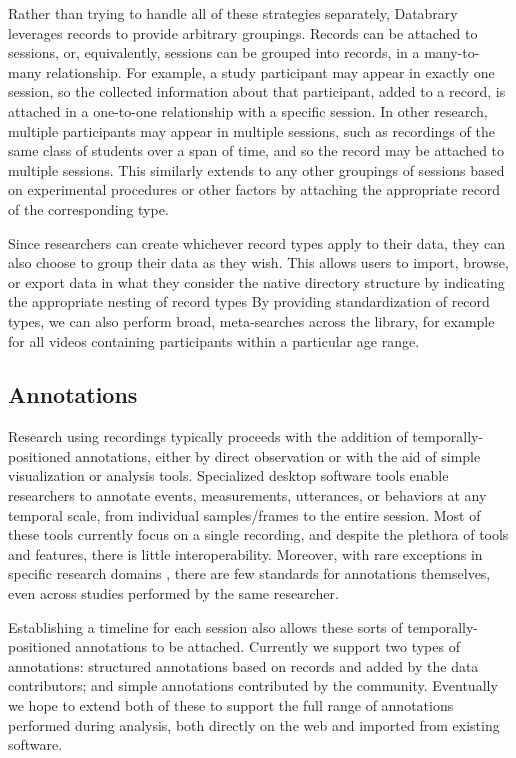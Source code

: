 \documentclass{sig-alternate}
\begin{document}
Rather than trying to handle all of these strategies separately, Databrary leverages records to provide arbitrary groupings.
Records can be attached to sessions, or, equivalently, sessions can be grouped into records, in a many-to-many relationship.
For example, a study participant may appear in exactly one session, so the collected information about that participant, added to a record, is attached in a one-to-one relationship with a specific session.
In other research, multiple participants may appear in multiple sessions, such as recordings of the same class of students over a span of time, and so the record may be attached to multiple sessions.
This similarly extends to any other groupings of sessions based on experimental procedures or other factors by attaching the appropriate record of the corresponding type.

Since researchers can create whichever record types apply to their data, they can also choose to group their data as they wish.
This allows users to import, browse, or export data in what they consider the native directory structure by indicating the appropriate nesting of record types
By providing standardization of record types, we can also perform broad, meta-searches across the library, for example for all videos containing participants within a particular age range.

\subsection{Annotations}

Research using recordings typically proceeds with the addition of temporally-positioned annotations, either by direct observation or with the aid of simple visualization or analysis tools.
Specialized desktop software tools enable researchers to annotate events, measurements, utterances, or behaviors at any temporal scale, from individual samples/frames to the entire session.
Most of these tools currently focus on a single recording, and despite the plethora of tools and features, there is little interoperability.
Moreover, with rare exceptions in specific research domains \cite{MacWhinney2001}, there are few standards for annotations themselves, even across studies performed by the same researcher. 

Establishing a timeline for each session also allows these sorts of temporally-positioned annotations to be attached.
Currently we support two types of annotations: structured annotations based on records and added by the data contributors; and simple annotations contributed by the community.
Eventually we hope to extend both of these to support the full range of annotations performed during analysis, both directly on the web and imported from existing software.
\end{document}
